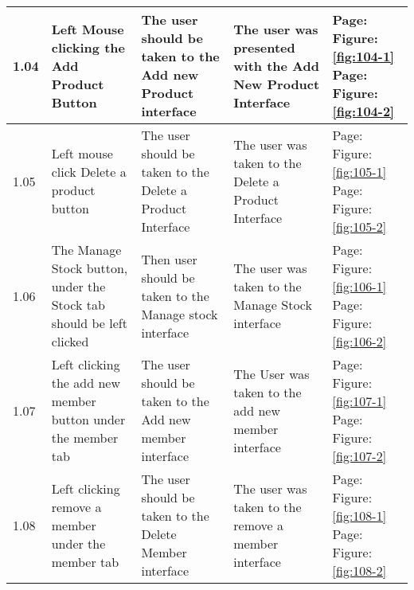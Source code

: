 \begin{flushleft}
\begin{longtable}{|p{1.0cm}|p{2.5cm}|p{3cm}|p{3.0cm}|p{2.5cm}|}
	1.04 & Left Mouse clicking the Add Product Button & The user should be taken to the Add new Product interface& The user was presented with the Add New Product Interface &  Page:\pageref{fig:104-1}  \newline Figure:\ref{fig:104-1} \newline  \newline Page:\pageref{fig:104-2}  \newline Figure:\ref{fig:104-2}\\ \hline
	1.05 &  Left mouse click Delete a product button& The user should be taken to the Delete a Product Interface & The user was taken to the Delete a Product Interface &  Page:\pageref{fig:105-1}  \newline Figure:\ref{fig:105-1} \newline  \newline Page:\pageref{fig:105-2}  \newline Figure:\ref{fig:105-2} \\ \hline
	1.06 & The Manage Stock button, under the Stock tab should be left clicked & Then user should be taken to the Manage stock interface & The user was taken to the Manage Stock interface &  Page:\pageref{fig:106-1}  \newline Figure:\ref{fig:106-1} \newline  \newline Page:\pageref{fig:106-2}  \newline Figure:\ref{fig:106-2}\\ \hline
	1.07 &  Left clicking the add new member button under the member tab & The user should be taken to the Add new member interface& The User was taken to the add new member interface &  Page:\pageref{fig:107-1}  \newline Figure:\ref{fig:107-1} \newline  \newline Page:\pageref{fig:107-2}  \newline Figure:\ref{fig:107-2} \\ \hline
	1.08 & Left clicking remove a member under the member tab & The user should be taken to the Delete Member interface & The user was taken to the remove a member interface &  Page:\pageref{fig:108-1}  \newline Figure:\ref{fig:108-1} \newline  \newline Page:\pageref{fig:108-2}  \newline Figure:\ref{fig:108-2} \\ \hline

\end{longtable}
\end{flushleft}
